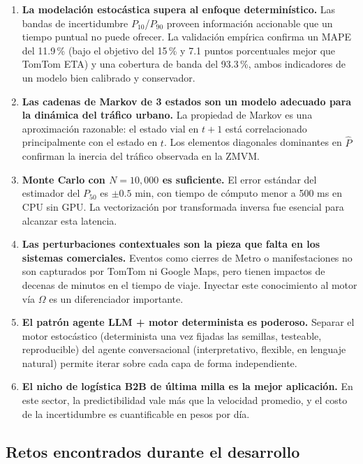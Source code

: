\documentclass[11pt,a4paper]{article}
\begin{document}
\begin{enumerate}[leftmargin=*]
\item \textbf{La modelación estocástica supera al enfoque determinístico.} Las bandas de incertidumbre $P_{10}$/$P_{90}$ proveen información accionable que un tiempo puntual no puede ofrecer. La validación empírica confirma un MAPE del 11.9\,\% (bajo el objetivo del 15\,\% y 7.1 puntos porcentuales mejor que TomTom ETA) y una cobertura de banda del 93.3\,\%, ambos indicadores de un modelo bien calibrado y conservador.

\item \textbf{Las cadenas de Markov de 3 estados son un modelo adecuado para la dinámica del tráfico urbano.} La propiedad de Markov es una aproximación razonable: el estado vial en $t+1$ está correlacionado principalmente con el estado en $t$. Los elementos diagonales dominantes en $\hat{P}$ confirman la inercia del tráfico observada en la ZMVM.

\item \textbf{Monte Carlo con $N=10{,}000$ es suficiente.} El error estándar del estimador del $P_{50}$ es $\pm 0.5$ min, con tiempo de cómputo menor a 500 ms en CPU sin GPU. La vectorización por transformada inversa fue esencial para alcanzar esta latencia.

\item \textbf{Las perturbaciones contextuales son la pieza que falta en los sistemas comerciales.} Eventos como cierres de Metro o manifestaciones no son capturados por TomTom ni Google Maps, pero tienen impactos de decenas de minutos en el tiempo de viaje. Inyectar este conocimiento al motor vía $\Omega$ es un diferenciador importante.

\item \textbf{El patrón agente LLM + motor determinista es poderoso.} Separar el motor estocástico (determinista una vez fijadas las semillas, testeable, reproducible) del agente conversacional (interpretativo, flexible, en lenguaje natural) permite iterar sobre cada capa de forma independiente.

\item \textbf{El nicho de logística B2B de última milla es la mejor aplicación.} En este sector, la predictibilidad vale más que la velocidad promedio, y el costo de la incertidumbre es cuantificable en pesos por día.
\end{enumerate}

\subsection{Retos encontrados durante el desarrollo}
\end{document}
